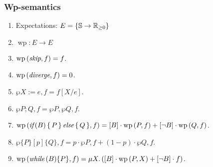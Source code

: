 \begin{frame}
	\frametitle{Wp-semantics}
	\begin{enumerate}
		\itemspacing{10pt}
		\item Expectations: $ E = \{ \mathbb{S} \to \mathbb{R}_{\geq 0} \} $
		\item $ \operatorname{wp} \colon E \to E $
		\item $\operatorname{wp}\left( \textit{skip}, f \right) = f$.
		\item $\operatorname{wp}\left( \textit{diverge}, f \right) = 0$.
		\item $\wp{X := e, f} = f[X/e]$.
		\item $\wp{P; Q, f} = \wp{P, \wp{Q, f}}$.
		\item $\operatorname{wp}\left( \textit{if}\,(B) \, \{ \, P \, \} \, \textit{else} \, \{ \, Q \, \}, f \right)
			= [B] \cdot \operatorname{wp}\left( P, f \right) + [\lnot B] \cdot \operatorname{wp}\left( Q, f \right)$.
		\item $\wp{\{ P \}[p]\{ Q \}, f}
			= p \cdot \wp{P, f} + (1-p) \cdot \wp{Q, f}$.
		\item $\operatorname{wp}\left( \textit{while}\,(B) \{P\}, f \right)
			= \mu X. \left( [B] \cdot \operatorname{wp}\left( P, X \right) + [\lnot B] \cdot f \right)$.
	\end{enumerate}
\end{frame}